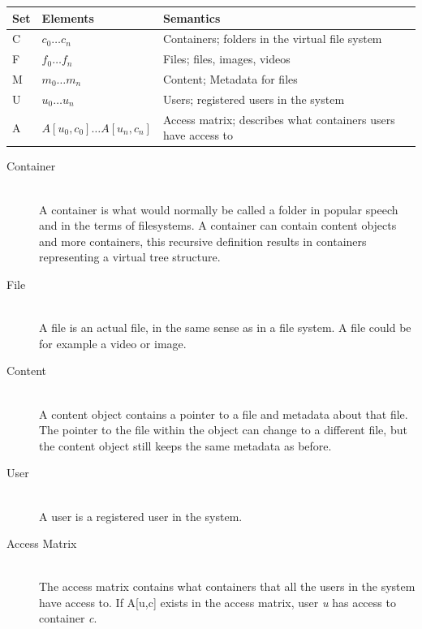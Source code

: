 \documentclass[a4paper,12pt]{article}
\begin{document}
\begin{center}
    \begin{tabular}{ | l | l | l | p{5cm} |}
        \hline
        \textbf{Set} & \textbf{Elements} & \textbf{Semantics} \\ \hline
        C   & $c_0\dots c_n$                & Containers; folders in the virtual file system\\ \hline
        F   & $f_0\dots f_n$                & Files; files, images, videos\\ \hline
        M   & $m_0\dots m_n$                & Content; Metadata for files\\ \hline
        U   & $u_0\dots u_n$                & Users; registered users in the system\\ \hline
        A   & $A[u_0,c_0]\dots A[u_n, c_n]$ & Access matrix; describes what containers users have access to\\ \hline
    \end{tabular}
\end{center}

\begin{description}
\item[Container] \hfill \\
    A container is what would normally be called a folder in popular speech and in the terms of
    filesystems. A container can contain content objects and more containers, this recursive
    definition results in containers representing a virtual tree structure.

\item[File] \hfill \\
    A file is an actual file, in the same sense as in a file system. A file could be for example a
    video or image.

\item[Content] \hfill \\
    A content object contains a pointer to a file and metadata about that file. The pointer to the
    file within the object can change to a different file, but the content object still keeps the
    same metadata as before.

\item[User] \hfill \\
    A user is a registered user in the system.

\item[Access Matrix] \hfill \\
    The access matrix contains what containers that all the users in the system have access to. If
    A[u,c] exists in the access matrix, user \textit{u} has access to container \textit{c}.

\end{description}
\end{document}

